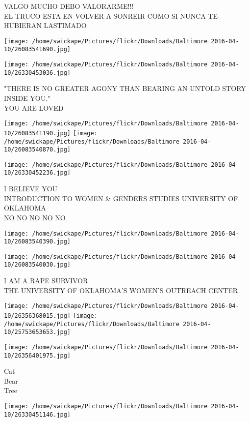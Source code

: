 \documentclass[10pt,letterpaper]{article}
\begin{document}
VALGO MUCHO DEBO VALORARME!!!\\
EL TRUCO ESTA EN VOLVER A SONREIR COMO SI NUNCA TE HUBIERAN LASTIMADO
\pagebreak

\texttt{[image: /home/swickape/Pictures/flickr/Downloads/Baltimore 2016-04-10/26083541690.jpg]}

\vspace{0.25in}
\texttt{[image: /home/swickape/Pictures/flickr/Downloads/Baltimore 2016-04-10/26330453036.jpg]}

"THERE IS NO GREATER AGONY THAN BEARING AN UNTOLD STORY INSIDE YOU."\\
YOU ARE LOVED
\pagebreak

\texttt{[image: /home/swickape/Pictures/flickr/Downloads/Baltimore 2016-04-10/26083541190.jpg]}
\texttt{[image: /home/swickape/Pictures/flickr/Downloads/Baltimore 2016-04-10/26083540870.jpg]}

\texttt{[image: /home/swickape/Pictures/flickr/Downloads/Baltimore 2016-04-10/26330452236.jpg]}

I BELIEVE YOU\\
INTRODUCTION TO WOMEN \& GENDERS STUDIES UNIVERSITY OF OKLAHOMA\\
NO NO NO NO NO
\pagebreak

\texttt{[image: /home/swickape/Pictures/flickr/Downloads/Baltimore 2016-04-10/26083540390.jpg]}

\vspace{0.25in}
\texttt{[image: /home/swickape/Pictures/flickr/Downloads/Baltimore 2016-04-10/26083540030.jpg]}

I AM A RAPE SURVIVOR\\
THE UNIVERSITY OF OKLAHOMA'S WOMEN'S OUTREACH CENTER
\pagebreak

\texttt{[image: /home/swickape/Pictures/flickr/Downloads/Baltimore 2016-04-10/26356368015.jpg]}
\texttt{[image: /home/swickape/Pictures/flickr/Downloads/Baltimore 2016-04-10/25753653653.jpg]}

\vspace{0.25in}
\texttt{[image: /home/swickape/Pictures/flickr/Downloads/Baltimore 2016-04-10/26356401975.jpg]}

Cat\\
Bear\\
Tree
\pagebreak

\texttt{[image: /home/swickape/Pictures/flickr/Downloads/Baltimore 2016-04-10/26330451146.jpg]}
\end{document}

